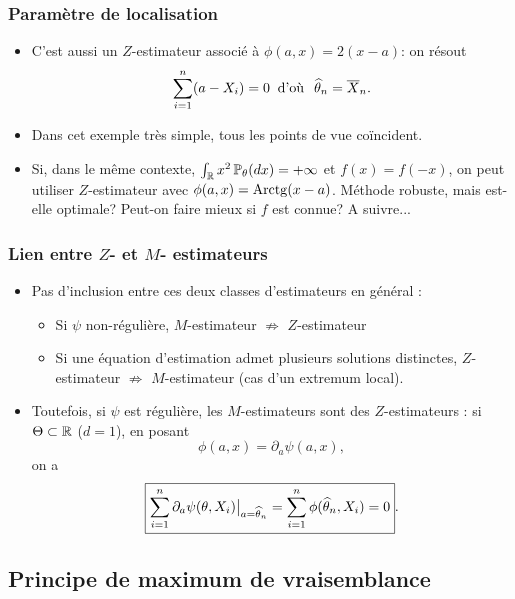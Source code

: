 \begin{frame}
\frametitle{Paramètre de localisation}
\begin{itemize}
\item C'est \alert{aussi} un $Z$-estimateur associé à $\phi(a,x)=2(x-a)$: on résout
$$\sum_{i = 1}^n (a-X_i)=0\;\;\text{d'où}\;\;\operatorname{\widehat \theta_{\mathnormal{n}}} = \overline{X}_n.$$
\item Dans cet \alert{exemple très simple},
tous les points de vue coïncident.
%
\item Si, dans le même contexte,
$\int_{\operatorname{{\mathbb R}}}x^2\operatorname{{\mathbb P}}_\theta(dx)=+\infty$ et $f(x)=f(-x)$, on peut
utiliser $Z$-estimateur avec $\phi(a,x)={\rm Arctg}(x-a)$. M\'ethode
robuste, mais est-elle optimale? Peut-on faire mieux \alert{si
$f$ est connue? A suivre...}
\end{itemize}
\end{frame}

\begin{frame}
\frametitle{Lien entre $Z$- et $M$- estimateurs}
\begin{itemize}
\item \alert{Pas d'inclusion} entre ces deux classes d'estimateurs \alert{en général} :
\begin{itemize}
\item Si $\psi$ non-régulière, $M$-estimateur $\nRightarrow$ $Z$-estimateur
\item Si une équation d'estimation admet plusieurs solutions distinctes, $Z$-estimateur $\nRightarrow$ $M$-estimateur (cas d'un extremum local).
\end{itemize}
\item Toutefois, si $\psi$ \alert{est régulière}, les $M$-estimateurs \alert{sont} des $Z$-estimateurs : si $\Theta \subset \operatorname{{\mathbb R}}$ ($d=1$), en posant
$$\phi(a,x) = \partial_a\psi(a,x),$$
on a
$$\boxed{\sum_{i = 1}^n \partial_{a} \psi(\theta, X_i)\big|_{a = \operatorname{\widehat \theta_{\mathnormal{n}}}}
= \sum_{i = 1}^n \phi(\operatorname{\widehat \theta_{\mathnormal{n}}}, X_i)=0}.$$
\end{itemize}
\end{frame}


\subsection{Principe de maximum de vraisemblance}

